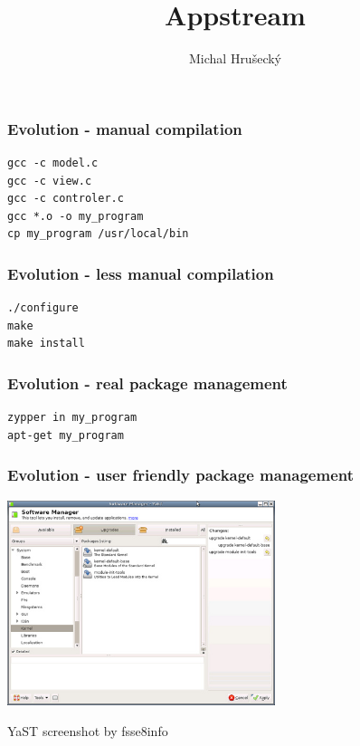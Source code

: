 \documentclass{beamer}
\author{Michal Hru\v{s}eck\'{y}\newline {\small openSUSE Boosters}}
\title{Appstream}
\begin{document}
\begin{frame}[t,plain]
\titlepage
\end{frame}


\begin{frame}[fragile]
\frametitle{Evolution - manual compilation}
\begin{center}
\begin{verbatim}
gcc -c model.c
gcc -c view.c
gcc -c controler.c
gcc *.o -o my_program
cp my_program /usr/local/bin
\end{verbatim}
\end{center}
\end{frame}

\begin{frame}[fragile]
\frametitle{Evolution - less manual compilation}
\begin{center}
\begin{verbatim}
./configure
make
make install
\end{verbatim}
\end{center}
\end{frame}

\begin{frame}[fragile]
\frametitle{Evolution - real package management}
\begin{center}
\begin{verbatim}
zypper in my_program
apt-get my_program
\end{verbatim}
\end{center}
\end{frame}

\begin{frame}
\frametitle{Evolution - user friendly package management}
\begin{center}
\includegraphics[height=6cm]{yast}

\small YaST screenshot by fsse8info
\end{center}
\end{frame}
\end{document}
